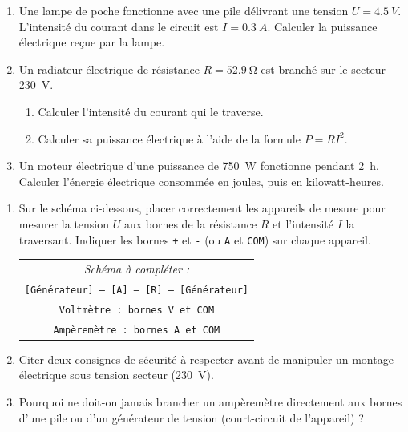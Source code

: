 \documentclass[11pt]{article}
\begin{document}
\begin{exercice}
\begin{enumerate}
    \item Une lampe de poche fonctionne avec une pile délivrant une tension $U = \SI{4,5}{V}$. L'intensité du courant dans le circuit est $I = \SI{0,3}{A}$. Calculer la puissance électrique reçue par la lampe.
    \item Un radiateur électrique de résistance $R = \SI{52,9}{\ohm}$ est branché sur le secteur \SI{230}{V}. 
    \begin{enumerate}
        \item Calculer l'intensité du courant qui le traverse.
        \item Calculer sa puissance électrique à l'aide de la formule $P = R I^2$.
    \end{enumerate}
    \item Un moteur électrique d'une puissance de \SI{750}{W} fonctionne pendant \SI{2}{h}. Calculer l'énergie électrique consommée en joules, puis en kilowatt-heures.
\end{enumerate}
\end{exercice}

\begin{exercice}
\begin{enumerate}
    \item Sur le schéma ci-dessous, placer correctement les appareils de mesure pour mesurer la tension $U$ aux bornes de la résistance $R$ et l'intensité $I$ la traversant. Indiquer les bornes \texttt{+} et \texttt{-} (ou \texttt{A} et \texttt{COM}) sur chaque appareil.
    \begin{center}
    \begin{tabular}{c}
    \textit{Schéma à compléter :} \\
    \texttt{[Générateur] --- [A] --- [R] --- [Générateur]} \\
    \texttt{Voltmètre : bornes V et COM} \\
    \texttt{Ampèremètre : bornes A et COM}
    \end{tabular}
    \end{center}
    \item Citer deux consignes de sécurité à respecter avant de manipuler un montage électrique sous tension secteur (\SI{230}{V}).
    \item Pourquoi ne doit-on jamais brancher un ampèremètre directement aux bornes d'une pile ou d'un générateur de tension (court-circuit de l'appareil) ?
\end{enumerate}
\end{exercice}
\end{document}
